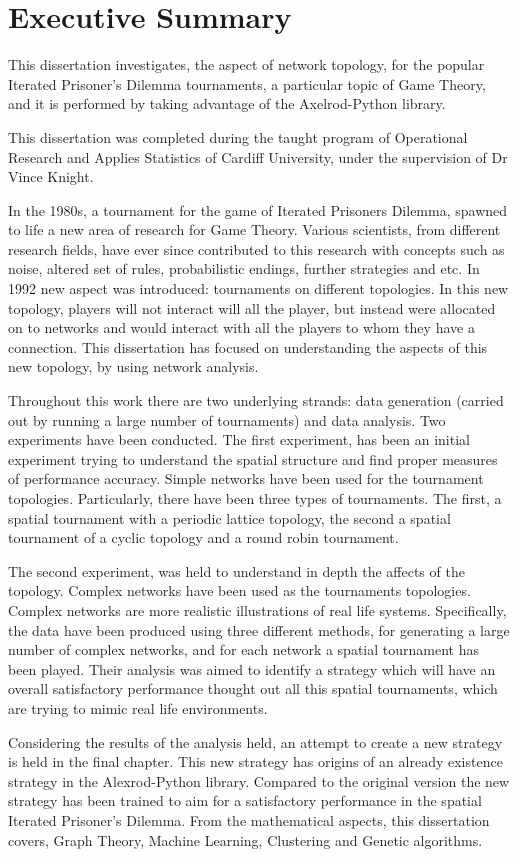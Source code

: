 \chapter{Executive Summary}
This dissertation investigates, the aspect of network topology, for the popular
Iterated Prisoner's Dilemma tournaments, a particular topic of  Game
Theory, and it is performed by taking advantage of the Axelrod-Python library.

This dissertation was completed during the taught program of Operational Research
and Applies Statistics of Cardiff University, under the supervision of Dr Vince
Knight.

In the 1980s, a tournament for the game of Iterated Prisoners Dilemma, spawned to
life a new area of research for Game Theory. Various scientists, from different
research fields, have ever since contributed to this research with concepts
such as noise, altered set of rules, probabilistic endings, further strategies and etc.
In 1992 new aspect was introduced: tournaments on different topologies.
In this new topology, players will not interact will all the player, but instead
were allocated on to networks and would interact with all the players to whom they have a
connection. This dissertation has focused on understanding the aspects of
this new topology, by using network analysis.

Throughout this work there are two underlying strands: data generation (carried
out by running a large number of tournaments) and data analysis.
Two experiments have been conducted. The first experiment, has been an initial
experiment trying to understand the spatial structure and find proper measures
of performance accuracy. Simple networks have been used for the tournament
topologies. Particularly, there have been three types of tournaments.
The first, a spatial tournament with a periodic lattice topology, the
second a spatial tournament of a cyclic topology and a round robin tournament.

The second experiment, was held to understand in depth the affects of the
topology. Complex networks have been used as the tournaments topologies. Complex
networks are more realistic illustrations of real life systems.
Specifically, the data have been produced using three different methods, for
generating a large number of complex networks, and for each network a spatial
tournament has been played. Their analysis was aimed to identify a strategy which
will have an overall satisfactory performance thought out all this spatial tournaments,
which are trying to mimic real life environments.

Considering the results of the analysis held, an attempt to create a new strategy
is held in the final chapter. This new strategy has origins of an already existence
strategy in the Alexrod-Python library. Compared to the original version the new
strategy has been trained to aim for a satisfactory performance in the spatial
Iterated Prisoner's Dilemma. From the mathematical aspects, this dissertation covers, Graph Theory,
Machine Learning, Clustering and Genetic algorithms.
